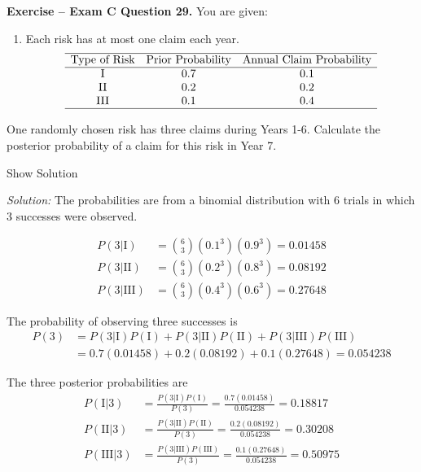 \documentclass[]{book}
\providecommand{\tightlist}{%
  \setlength{\itemsep}{0pt}\setlength{\parskip}{0pt}}
\theoremstyle{definition}
\theoremstyle{definition}
\theoremstyle{definition}
\theoremstyle{remark}
\begin{document}
\textbf{Exercise -- Exam C Question 29.} You are given:

\begin{enumerate}
\def\labelenumi{(\roman{enumi})}
\tightlist
\item
  Each risk has at most one claim each year. \[\begin{array}{ccc}
  \hline
  \text{Type of Risk} & \text{Prior Probability} & \text{Annual Claim Probability} \\
  \hline
  \text{I} & 0.7 & 0.1 \\
  \text{II} & 0.2 & 0.2 \\
  \text{III} & 0.1 & 0.4 \\ 
  \hline
  \end{array}\]
\end{enumerate}

One randomly chosen risk has three claims during Years 1-6. Calculate
the posterior probability of a claim for this risk in Year 7.

Show Solution

\hypertarget{toggleExamC29}{}
\emph{Solution:} The probabilities are from a binomial distribution with
6 trials in which 3 successes were observed.

\[\begin{aligned} 
P(3|\text{I}) &= {6 \choose 3} (0.1^3)(0.9^3) = 0.01458 \\
P(3|\text{II}) &= {6 \choose 3} (0.2^3)(0.8^3) = 0.08192 \\
P(3|\text{III}) &= {6 \choose 3} (0.4^3)(0.6^3) = 0.27648
\end{aligned}\]

The probability of observing three successes is
\[\begin{aligned} P(3) &= P(3|\text{I})P(\text{I}) + P(3|\text{II})P(\text{II}) + P(3|\text{III})P(\text{III}) \\
&=  0.7(0.01458) + 0.2(0.08192) + 0.1(0.27648) = 0.054238
\end{aligned}\]

The three posterior probabilities are \[\begin{aligned}
P(\text{I}|3) &= \frac{P(3|\text{I})P(\text{I})}{P(3)} = \frac{0.7(0.01458)}{0.054238} = 0.18817 \\
P(\text{II}|3) &= \frac{P(3|\text{II})P(\text{II})}{P(3)} = \frac{0.2(0.08192)}{0.054238} = 0.30208 \\
P(\text{III}|3) &= \frac{P(3|\text{III})P(\text{III})}{P(3)} = \frac{0.1(0.27648)}{0.054238} = 0.50975 
\end{aligned}\]
\end{document}
